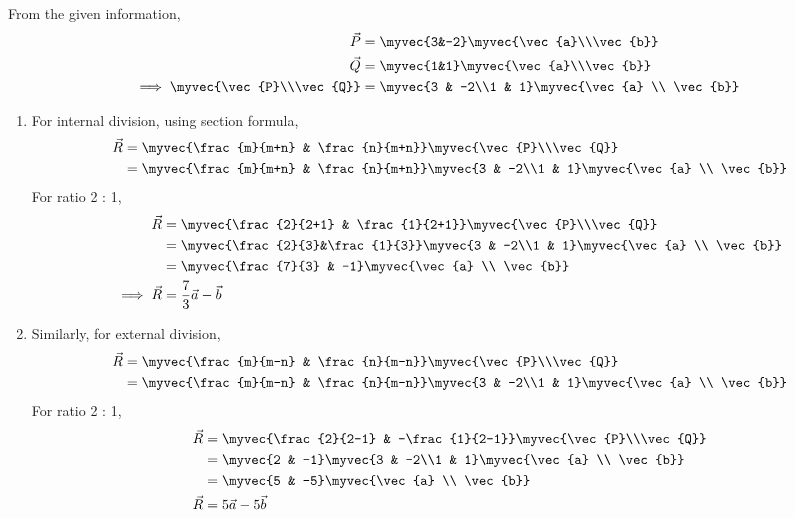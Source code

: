 From the given information, 
\begin{align}
\vec{P} &= \myvec{3&-2}\myvec{\vec{a}\\\vec{b}}\\
\vec{Q} &= \myvec{1&1}\myvec{\vec{a}\\\vec{b}}
\\
\implies \myvec{\vec{P}\\\vec{Q}} &= \myvec{3 & -2\\1 & 1}\myvec{\vec{a} \\ \vec{b}}
\end{align}
\begin{enumerate}
\item 
For  internal division, using section formula, 
\begin{align}
\vec{R} &= \myvec{\frac{m}{m+n} & \frac{n}{m+n}}\myvec{\vec{P}\\\vec{Q}}\\
&= \myvec{\frac{m}{m+n} & \frac{n}{m+n}}\myvec{3 & -2\\1 & 1}\myvec{\vec{a} \\ \vec{b}}
\end{align}
For ratio 2 : 1,
\begin{align}
\vec{R} &= \myvec{\frac{2}{2+1} & \frac{1}{2+1}}\myvec{\vec{P}\\\vec{Q}}\\
&= \myvec{\frac{2}{3}&\frac{1}{3}}\myvec{3 & -2\\1 & 1}\myvec{\vec{a} \\ \vec{b}}\\
&= \myvec{\frac{7}{3} & -1}\myvec{\vec{a} \\ \vec{b}}\\
\implies \vec{R} &= \frac{7}{3}\vec{a} - \vec{b}
\end{align}

\item Similarly,  for external division,
\begin{align}
\vec{R} &= \myvec{\frac{m}{m-n} & \frac{n}{m-n}}\myvec{\vec{P}\\\vec{Q}}\\
&= \myvec{\frac{m}{m-n} & \frac{n}{m-n}}\myvec{3 & -2\\1 & 1}\myvec{\vec{a} \\ \vec{b}}
\end{align}
For ratio 2 : 1,
\begin{align}
\vec{R} &= \myvec{\frac{2}{2-1} & -\frac{1}{2-1}}\myvec{\vec{P}\\\vec{Q}}\\
&= \myvec{2 & -1}\myvec{3 & -2\\1 & 1}\myvec{\vec{a} \\ \vec{b}}\\
&= \myvec{5 & -5}\myvec{\vec{a} \\ \vec{b}}\\
\vec{R} &= 5\vec{a} - 5\vec{b}
\end{align}
%
\end{enumerate}